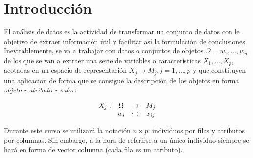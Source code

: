 
\newcommand{\estudiante}{García Justel, Alan}
\newcommand{\titulo}{MÁSTER EN INGENIERÍA COMPUTACIONAL Y SISTEMAS INTELIGENTES}
\newcommand{\asignatura}{EXPLORACIÓN Y ANÁLISIS DE DATOS}
\newcommand{\portada}{common/no_signal.png}
\newcommand{\colorportada}{title_green}
\newcommand{\curso}{2024-2025}



\newpage
\tableofcontents\thispagestyle{empty} \newpage

\section{Introducción}
El análisis de datos es la actividad de transformar un conjunto de datos con le objetivo de extraer información útil y facilitar así la formulación de conclusiones. Inevitablemente, se va a trabajar con datos o conjuntos de objetos $\Omega = {w_1,\dots,w_n}$ de los que se van a extraer una serie de variables o características $X_1,\dots,X_p$, acotadas en un espacio de representación $X_j \rightarrow M_j, j = 1,\dots,p$ y que constituyen una aplicacion de forma que se consigue la descripción de los objetos en forma \textit{objeto - atributo - valor}:

\[
\begin{array}{c c c c}
    X_j: & \Omega & \rightarrow & M_j \\
         & w_i & \hookrightarrow & x_{ij}
\end{array}
\]

Durante este curso se utilizará la notación $n \times p$: individuos por filas y atributos por columnas. Sin embargo, a la hora de referirse a un único individuo siempre se hará en forma de vector columna (cada fila es un atributo).

